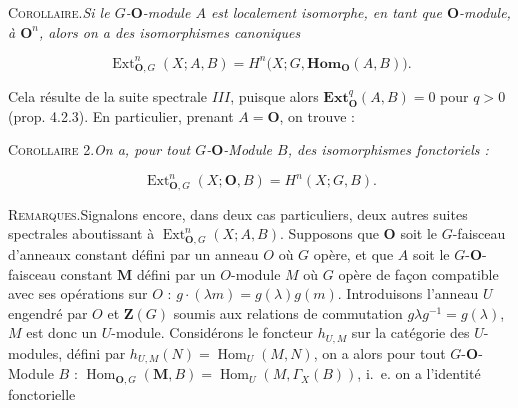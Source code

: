 \clearpage
{}

\textsc{Corollaire.}\quad \textit{Si le $G$-${\mathbf O}$-module $A$ est
localement isomorphe, en tant que ${\mathbf O}$-module, à ${\mathbf O}^n$, alors on a des
isomorphismes canoniques}

\begin{equation}
\operatorname{Ext}_{{\mathbf O},G}^n(X;A,B)
  =H^n\bigl(X;G,\mathbf{Hom}_{\mathbf O}(A,B)\bigr).
\tag{5.6.12}
\end{equation}

Cela résulte de la suite spectrale $III$, puisque alors
$\mathbf{Ext}_{\mathbf O}^q(A,B)=0$ pour $q>0$ (prop. 4.2.3). En particulier, prenant
$A={\mathbf O}$, on trouve :

\textsc{Corollaire 2.}\quad \textit{On a, pour tout $G$-${\mathbf O}$-Module
$B$, des isomorphismes fonctoriels :}

\begin{equation}
\operatorname{Ext}_{{\mathbf O},G}^n(X;{\mathbf O},B)=H^n(X;G,B).
\tag{5.6.14}
\end{equation}

\textsc{Remarques.}\quad Signalons encore, dans deux cas
particuliers, deux autres suites spectrales aboutissant à
$\operatorname{Ext}_{{\mathbf O},G}^n(X;A,B)$.
Supposons que ${\mathbf O}$ soit le $G$-faisceau d'anneaux constant défini par un anneau
$O$ où $G$ opère, et que $A$ soit le $G$-${\mathbf O}$-faisceau constant $\mathbf M$
défini par un $O$-module $M$ où $G$ opère de façon compatible avec ses
opérations sur $O$ : $g\cdot(\lambda m)=g(\lambda)g(m)$. Introduisons
l'anneau $U$ engendré par $O$ et $\mathbf Z(G)$ soumis aux relations de
commutation $g\lambda g^{-1}=g(\lambda)$, $M$ est donc un $U$-module.
Considérons le foncteur $h_{U,M}$ sur la catégorie des $U$-modules, défini par
$h_{U,M}(N)=\operatorname{Hom}_U(M,N)$, on a alors pour tout $G$-${\mathbf O}$-Module
$B$ :
$\operatorname{Hom}_{{\mathbf O},G}({\mathbf M},B)=\operatorname{Hom}_U(M,\Gamma_X(B))$, i.~e.
on a l'identité fonctorielle

